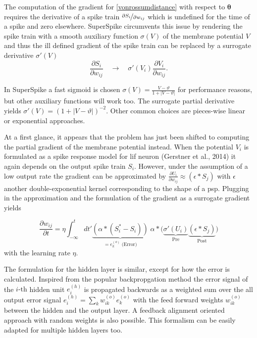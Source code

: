 The computation of the gradient for \ref{vonrossumdistance} with respect to $\mathbf{\theta}$ requires the derivative of a spike train  $\nicefrac{\partial{S_i}}{\partial{w_{ij}}}$ which is undefined for the time of a spike and zero elsewhere. SuperSpike circumvents this issue by rendering the spike train with a smooth auxiliary function $\sigma(V)$ of the membrane potential $V$ and thus the ill defined gradient of the spike train can be replaced by a surrogate derivative $\sigma'(V)$
\begin{equation}
\frac{\partial S_i}{\partial w_{ij}} \quad \rightarrow \quad \sigma'(V_i)\frac{\partial V_i}{\partial w_{ij}}.
\end{equation}

In SuperSpike a fast sigmoid is chosen $\sigma(V) = \frac{V - \vartheta}{1 + |V - \vartheta|}$ for performance reasons, but other auxiliary functions will work too. The surrogate partial derivative yields $\sigma'(V) = \left(1 + |V - \vartheta|\right)^{-2}$. Other common choices are pieces-wise linear or exponential approaches.

At a first glance, it appears that the problem has just been shifted to computing the partial gradient of the membrane potential instead. When the potential $V_i$ is formulated as a spike response model for \gls{lif} neuron (Gerstner et al., 2014) it again depends on the output spike train $S_i$. However, under the assumption of a low output rate the gradient can be approximated by $\frac{\partial U_i}{\partial w_{ij}} \approx (\epsilon \ast S_j)$ with $\epsilon$ another double-exponential kernel corresponding to the shape of a \gls{psp}. Plugging in the approximation and the formulation of the gradient as a surrogate gradient yields

\begin{equation}
\label{superspikeweightupdateeq}
\frac{\partial w_{ij}}{\partial t} = \eta \int_{-\infty}^{t} dt'
\underbrace{\left(\alpha \ast (S^*_i - S_i)\right)}_{= e^{(o)}_k \; \text{(Error)}} 
\; \alpha \ast 
\Big(\underbrace{\sigma'(U_i)}_{\text{Pre}} 
\underbrace{\left(\epsilon \ast S_j\right)}_{\text{Post}}\Big)
\end{equation}
with the learning rate $\eta$. 

The formulation for the hidden layer is similar, except for how the error is calculated. Inspired from the popular backpropgation method the error signal of the $i \text{-th}$ hidden unit $e^{(h)}_i$ is propagated backwards as a weighted sum over the all output error signal $e^{(h)}_i = \sum_{k} w_{ik}^{(o)} e^{(o)}_k$ with the feed forward weights $w_{ik}^{(o)}$ between the hidden and the output layer. A feedback alignment oriented approach with random weights is also possible. This formalism can be easily adapted for multiple hidden layers too.

